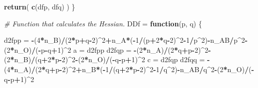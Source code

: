 \documentclass[]{article}
\newenvironment{Shaded}{\begin{snugshade}}{\end{snugshade}}
\newcommand{\KeywordTok}[1]{\textcolor[rgb]{0.13,0.29,0.53}{\textbf{#1}}}
\newcommand{\DecValTok}[1]{\textcolor[rgb]{0.00,0.00,0.81}{#1}}
\newcommand{\StringTok}[1]{\textcolor[rgb]{0.31,0.60,0.02}{#1}}
\newcommand{\CommentTok}[1]{\textcolor[rgb]{0.56,0.35,0.01}{\textit{#1}}}
\newcommand{\ControlFlowTok}[1]{\textcolor[rgb]{0.13,0.29,0.53}{\textbf{#1}}}
\newcommand{\OperatorTok}[1]{\textcolor[rgb]{0.81,0.36,0.00}{\textbf{#1}}}
\newcommand{\NormalTok}[1]{#1}
\begin{document}
\begin{Shaded}
\begin{Highlighting}[]
  \KeywordTok{return}\NormalTok{( }\KeywordTok{c}\NormalTok{(dfp, dfq) )}
\NormalTok{\}}

\CommentTok{# Function that calculates the Hessian.}
\NormalTok{DDf =}\StringTok{ }\ControlFlowTok{function}\NormalTok{(p, q) \{}
  
\NormalTok{    d2fpp =}\StringTok{ }\OperatorTok{-}\NormalTok{(}\DecValTok{4}\OperatorTok{*}\NormalTok{n_B)}\OperatorTok{/}\NormalTok{(}\DecValTok{2}\OperatorTok{*}\NormalTok{p}\OperatorTok{+}\NormalTok{q}\OperatorTok{-}\DecValTok{2}\NormalTok{)}\OperatorTok{^}\DecValTok{2}\OperatorTok{+}\NormalTok{n_A}\OperatorTok{*}\NormalTok{(}\OperatorTok{-}\DecValTok{1}\OperatorTok{/}\NormalTok{(p}\OperatorTok{+}\DecValTok{2}\OperatorTok{*}\NormalTok{q}\OperatorTok{-}\DecValTok{2}\NormalTok{)}\OperatorTok{^}\DecValTok{2}\OperatorTok{-}\DecValTok{1}\OperatorTok{/}\NormalTok{p}\OperatorTok{^}\DecValTok{2}\NormalTok{)}\OperatorTok{-}\NormalTok{n_AB}\OperatorTok{/}\NormalTok{p}\OperatorTok{^}\DecValTok{2}\OperatorTok{-}\NormalTok{(}\DecValTok{2}\OperatorTok{*}\NormalTok{n_O)}\OperatorTok{/}\NormalTok{(}\OperatorTok{-}\NormalTok{p}\OperatorTok{-}\NormalTok{q}\OperatorTok{+}\DecValTok{1}\NormalTok{)}\OperatorTok{^}\DecValTok{2}
\NormalTok{    a =}\StringTok{ }\NormalTok{d2fpp}
\NormalTok{    d2fqp =}\StringTok{ }\OperatorTok{-}\NormalTok{(}\DecValTok{2}\OperatorTok{*}\NormalTok{n_A)}\OperatorTok{/}\NormalTok{(}\DecValTok{2}\OperatorTok{*}\NormalTok{q}\OperatorTok{+}\NormalTok{p}\OperatorTok{-}\DecValTok{2}\NormalTok{)}\OperatorTok{^}\DecValTok{2}\OperatorTok{-}\NormalTok{(}\DecValTok{2}\OperatorTok{*}\NormalTok{n_B)}\OperatorTok{/}\NormalTok{(q}\OperatorTok{+}\DecValTok{2}\OperatorTok{*}\NormalTok{p}\OperatorTok{-}\DecValTok{2}\NormalTok{)}\OperatorTok{^}\DecValTok{2}\OperatorTok{-}\NormalTok{(}\DecValTok{2}\OperatorTok{*}\NormalTok{n_O)}\OperatorTok{/}\NormalTok{(}\OperatorTok{-}\NormalTok{q}\OperatorTok{-}\NormalTok{p}\OperatorTok{+}\DecValTok{1}\NormalTok{)}\OperatorTok{^}\DecValTok{2}
\NormalTok{    c =}\StringTok{ }\NormalTok{d2fqp    }
\NormalTok{    d2fqq =}\StringTok{ }\OperatorTok{-}\NormalTok{(}\DecValTok{4}\OperatorTok{*}\NormalTok{n_A)}\OperatorTok{/}\NormalTok{(}\DecValTok{2}\OperatorTok{*}\NormalTok{q}\OperatorTok{+}\NormalTok{p}\OperatorTok{-}\DecValTok{2}\NormalTok{)}\OperatorTok{^}\DecValTok{2}\OperatorTok{+}\NormalTok{n_B}\OperatorTok{*}\NormalTok{(}\OperatorTok{-}\DecValTok{1}\OperatorTok{/}\NormalTok{(q}\OperatorTok{+}\DecValTok{2}\OperatorTok{*}\NormalTok{p}\OperatorTok{-}\DecValTok{2}\NormalTok{)}\OperatorTok{^}\DecValTok{2}\OperatorTok{-}\DecValTok{1}\OperatorTok{/}\NormalTok{q}\OperatorTok{^}\DecValTok{2}\NormalTok{)}\OperatorTok{-}\NormalTok{n_AB}\OperatorTok{/}\NormalTok{q}\OperatorTok{^}\DecValTok{2}\OperatorTok{-}\NormalTok{(}\DecValTok{2}\OperatorTok{*}\NormalTok{n_O)}\OperatorTok{/}\NormalTok{(}\OperatorTok{-}\NormalTok{q}\OperatorTok{-}\NormalTok{p}\OperatorTok{+}\DecValTok{1}\NormalTok{)}\OperatorTok{^}\DecValTok{2}

\end{Highlighting}
\end{Shaded}
\end{document}
